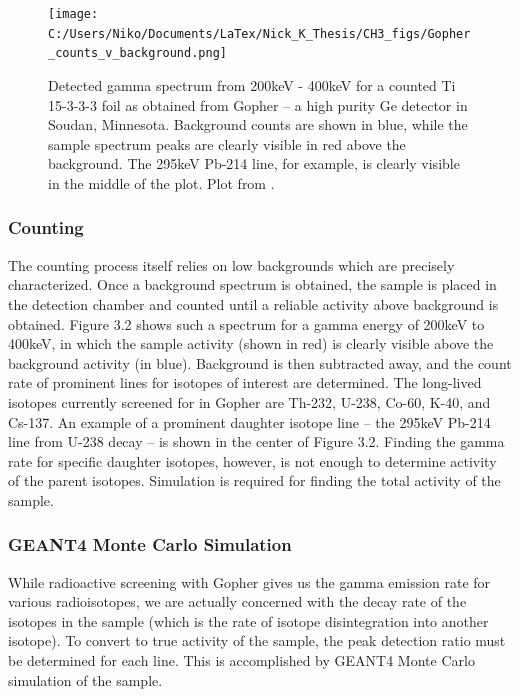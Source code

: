 \documentclass{report}
\begin{document}
\begin{figure}
\centering
\texttt{[image: C:/Users/Niko/Documents/LaTex/Nick\_K\_Thesis/CH3\_figs/Gopher\_counts\_v\_background.png]}
\caption{Detected gamma spectrum from 200keV - 400keV for a counted Ti 15-3-3-3 foil as obtained from Gopher -- a high purity Ge detector in Soudan, Minnesota. Background counts are shown in blue, while the sample spectrum peaks are clearly visible in red above the background. The 295keV Pb-214 line, for example, is clearly visible in the middle of the plot. Plot from \cite{GopherTi15333}.}
\end{figure}

\subsubsection{Counting}
The counting process itself relies on low backgrounds which are precisely characterized. Once a background spectrum is obtained, the sample is placed in the detection chamber and counted until a reliable activity above background is obtained. Figure 3.2 shows such a spectrum for a gamma energy of 200keV to 400keV, in which the sample activity (shown in red) is clearly visible above the background activity (in blue). Background is then subtracted away, and the count rate of prominent lines for isotopes of interest are determined. The long-lived isotopes currently screened for in Gopher are Th-232, U-238, Co-60, K-40, and Cs-137. An example of a prominent daughter isotope line -- the 295keV Pb-214 line from U-238 decay -- is shown in the center of Figure 3.2. Finding the gamma rate for specific daughter isotopes, however, is not enough to determine activity of the parent isotopes. Simulation is required for finding the total activity of the sample.

\subsubsection{GEANT4 Monte Carlo Simulation}
While radioactive screening with Gopher gives us the gamma emission rate for various radioisotopes, we are actually concerned with the decay rate of the isotopes in the sample (which is the rate of isotope disintegration into another isotope). To convert to true activity of the sample, the peak detection ratio must be determined for each line. This is accomplished by GEANT4 Monte Carlo simulation of the sample.
\end{document}
